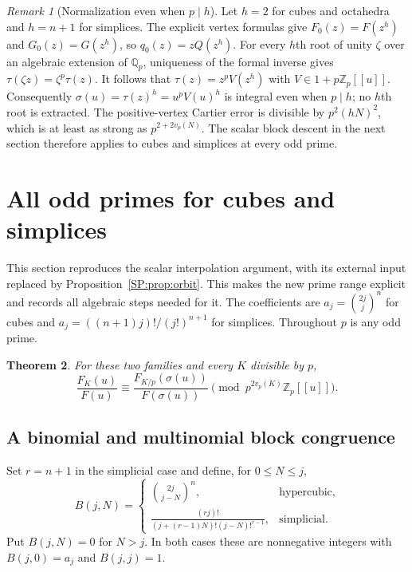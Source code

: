 \documentclass[11pt,a4paper]{article}
\newtheorem{theorem}{Theorem}[section]
\theoremstyle{definition}\newtheorem{definition}[theorem]{Definition}
\theoremstyle{remark}\newtheorem{remark}[theorem]{Remark}
\newcommand{\Zp}{\mathbb Z_p}
\numberwithin{equation}{section}
\begin{document}
\begin{remark}[Normalization even when $p\mid h$]
Let $h=2$ for cubes and octahedra and $h=n+1$ for simplices.
The explicit vertex formulas give $F_0(z)=F(z^h)$ and
$G_0(z)=G(z^h)$, so $q_0(z)=zQ(z^h)$. For every $h$th root of
unity $\zeta$ over an algebraic extension of $\mathbb Q_p$,
uniqueness of the formal inverse gives
$\tau(\zeta z)=\zeta^p\tau(z)$. It follows that
$\tau(z)=z^pV(z^h)$ with $V\in1+p\mathbb Z_p[[u]]$.
Consequently $\sigma(u)=\tau(z)^h=u^pV(u)^h$ is integral even
when $p\mid h$; no $h$th root is extracted. The positive-vertex
Cartier error is divisible by $p^2(hN)^2$, which is at least
as strong as $p^{2+2v_p(N)}$. The scalar block descent in the next section therefore applies to
cubes and simplices at every odd prime.
\end{remark}

\section{All odd primes for cubes and simplices}\label{SP:source-main-3}
This section reproduces the scalar interpolation argument, with its
external input replaced by Proposition~\ref{SP:prop:orbit}. This makes the
new prime range explicit and records all algebraic steps needed for it.
The coefficients are $a_j=\binom{2j}{j}^n$ for cubes and
$a_j=((n+1)j)!/(j!)^{n+1}$ for simplices. Throughout $p$ is any odd prime.
\begin{theorem}\label{SP:S:thm:positive-cube-simplex}
For these two families and every $K$ divisible by $p$,
\begin{equation}\label{SP:S:eq:positive-main}
\frac{F_K(u)}{F(u)}\equiv
\frac{F_{K/p}(\sigma(u))}{F(\sigma(u))}
\pmod{p^{2v_p(K)}\Zp[[u]]}.
\end{equation}
\end{theorem}
\subsection{A binomial and multinomial block congruence}

Set \(r=n+1\) in the simplicial case and define, for
\(0\leq N\leq j\),
\[
 B(j,N)=
 \begin{cases}
 \displaystyle\binom{2j}{j-N}^{n},&\text{hypercubic},\\[7pt]
 \displaystyle\frac{(rj)!}
 {(j+(r-1)N)!(j-N)!^{r-1}},&\text{simplicial}.
 \end{cases}
\]
Put \(B(j,N)=0\) for \(N>j\).
In both cases these are nonnegative integers with
\(B(j,0)=a_j\) and \(B(j,j)=1\).
\end{document}
